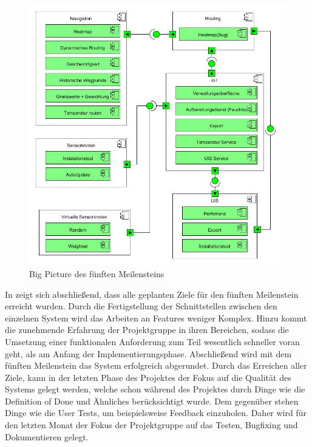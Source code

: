 \begin{figure}[!htb]
	\centering
	\includegraphics[width=\textwidth]{./ressourcen/bigpicture4.png}
	\caption{Big Picture des fünften Meilensteins}
	\label{fig:bigpicture4}
\end{figure}

In  zeigt sich abschließend, dass alle geplanten Ziele für den fünften Meilenstein erreicht wurden.
Durch die Fertigstellung der Schnittstellen zwischen den einzelnen System wird das Arbeiten an Features weniger Komplex.
Hinzu kommt die zunehmende Erfahrung der Projektgruppe in ihren Bereichen, sodass die Umsetzung einer funktionalen Anforderung zum Teil wesentlich schneller voran geht, als am Anfang der Implementierungsphase.
Abschließend wird mit dem fünften Meilenstein das System erfolgreich abgerundet.
Durch das Erreichen aller Ziele, kann in der letzten Phase des Projektes der Fokus auf die Qualität des Systems gelegt werden, welche schon während des Projektes durch Dinge wie die Definition of Done und Ähnliches berücksichtigt wurde.
Dem gegenüber stehen Dinge wie die User Tests, um beispielsweise Feedback einzuholen.
Daher wird für den letzten Monat der Fokus der Projektgruppe auf das Testen, Bugfixing und Dokumentieren gelegt.